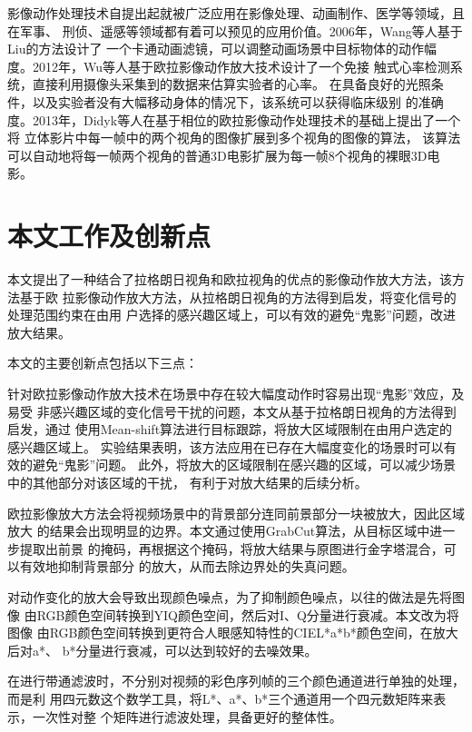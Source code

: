 影像动作处理技术自提出起就被广泛应用在影像处理、动画制作、医学等领域，且在军事、
刑侦、遥感等领域都有着可以预见的应用价值。2006年，Wang等人基于Liu的方法设计了
一个卡通动画滤镜，可以调整动画场景中目标物体的动作幅
度。2012年，Wu等人基于欧拉影像动作放大技术设计了一个免接
触式心率检测系统，直接利用摄像头采集到的数据来估算实验者的心率。
在具备良好的光照条件，以及实验者没有大幅移动身体的情况下，该系统可以获得临床级别
的准确度。2013年，Didyk等人在基于相位的欧拉影像动作处理技术的基础上提出了一个将
立体影片中每一帧中的两个视角的图像扩展到多个视角的图像的算法，
该算法可以自动地将每一帧两个视角的普通3D电影扩展为每一帧8个视角的裸眼3D电影。

\section{本文工作及创新点}
\label{sec:creation}

本文提出了一种结合了拉格朗日视角和欧拉视角的优点的影像动作放大方法，该方法基于欧
拉影像动作放大方法，从拉格朗日视角的方法得到启发，将变化信号的处理范围约束在由用
户选择的感兴趣区域上，可以有效的避免“鬼影”问题，改进放大结果。

本文的主要创新点包括以下三点：

\begin{compactenum}
\item %
  针对欧拉影像动作放大技术在场景中存在较大幅度动作时容易出现“鬼影”效应，及易受
  非感兴趣区域的变化信号干扰的问题，本文从基于拉格朗日视角的方法得到启发，通过
  使用Mean-shift算法进行目标跟踪，将放大区域限制在由用户选定的感兴趣区域上。
  实验结果表明，该方法应用在已存在大幅度变化的场景时可以有效的避免“鬼影”问题。
  此外，将放大的区域限制在感兴趣的区域，可以减少场景中的其他部分对该区域的干扰，
  有利于对放大结果的后续分析。
\item %
  欧拉影像放大方法会将视频场景中的背景部分连同前景部分一块被放大，因此区域放大
  的结果会出现明显的边界。本文通过使用GrabCut算法，从目标区域中进一步提取出前景
  的掩码，再根据这个掩码，将放大结果与原图进行金字塔混合，可以有效地抑制背景部分
  的放大，从而去除边界处的失真问题。
\item 对动作变化的放大会导致出现颜色噪点，为了抑制颜色噪点，以往的做法是先将图像
  由RGB颜色空间转换到YIQ颜色空间，然后对I、Q分量进行衰减。本文改为将图像
  由RGB颜色空间转换到更符合人眼感知特性的CIEL*a*b*颜色空间，在放大后对a*、
  b*分量进行衰减，可以达到较好的去噪效果。
\item %
  在进行带通滤波时，不分别对视频的彩色序列帧的三个颜色通道进行单独的处理，而是利
  用四元数这个数学工具，将L*、a*、b*三个通道用一个四元数矩阵来表示，一次性对整
  个矩阵进行滤波处理，具备更好的整体性。
\end{compactenum}

